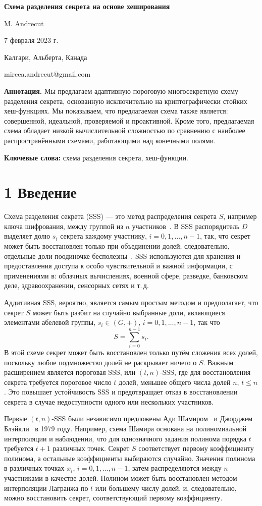 \textbf{Схема разделения секрета на основе хеширования}

M. Andrecut

7 февраля 2023 г.

Калгари, Альберта, Канада

mircea.andrecut@gmail.com

\textbf{Аннотация.}
Мы предлагаем адаптивную пороговую многосекретную схему разделения секрета, основанную исключительно на криптографически стойких хеш-функциях. Мы показываем, что предлагаемая схема также является: совершенной, идеальной, проверяемой и проактивной. Кроме того, предлагаемая схема обладает низкой вычислительной сложностью по сравнению с наиболее распространёнными схемами, работающими над конечными полями.

\textbf{Ключевые слова:} схема разделения секрета, хеш-функции.

\section*{1 \quad Введение}

Схема разделения секрета (SSS) — это метод распределения секрета \(S\), например ключа шифрования, между группой из \(n\) участников~\cite{1}. В SSS распорядитель \(D\) выделяет долю \(s_i\) секрета каждому участнику, \(i=0,1,\ldots,n-1\), так, что секрет может быть восстановлен только при объединении долей; следовательно, отдельные доли поодиночке бесполезны~\cite{2}. SSS используются для хранения и предоставления доступа к особо чувствительной и важной информации, с применениями в: облачных вычислениях, военной сфере, разведке, банковском деле, здравоохранении, сенсорных сетях и т.\,д.

Аддитивная SSS, вероятно, является самым простым методом и предполагает, что секрет \(S\) может быть разбит на случайно выбранные доли, являющиеся элементами абелевой группы, \(s_i \in (G,+)\), \(i=0,1,\ldots,n-1\), так что
\[
S=\sum_{i=0}^{n-1} s_i .
\]
В этой схеме секрет может быть восстановлен только путём сложения всех долей, поскольку любое подмножество долей не раскрывает ничего о \(S\). Важным расширением является пороговая SSS, или \((t,n)\)-SSS, где для восстановления секрета требуется пороговое число \(t\) долей, меньшее общего числа долей \(n\), \(t\le n\). Это повышает устойчивость SSS и предотвращает отказ в восстановлении секрета в случае недоступности одного или нескольких участников.

Первые \((t,n)\)-SSS были независимо предложены Ади Шамиром~\cite{3} и Джорджем Блэйкли~\cite{4} в 1979 году. Например, схема Шамира основана на полиномиальной интерполяции и наблюдении, что для однозначного задания полинома порядка \(t\) требуется \(t+1\) различных точек. Секрет \(S\) соответствует первому коэффициенту полинома, а остальные коэффициенты выбираются случайно. Значения полинома в различных точках \(x_i\), \(i=0,1,\ldots,n-1\), затем распределяются между \(n\) участниками в качестве долей. Полином может быть восстановлен методом интерполяции Лагранжа по \(t\) или большему числу долей, и, следовательно, можно восстановить секрет, соответствующий первому коэффициенту.

